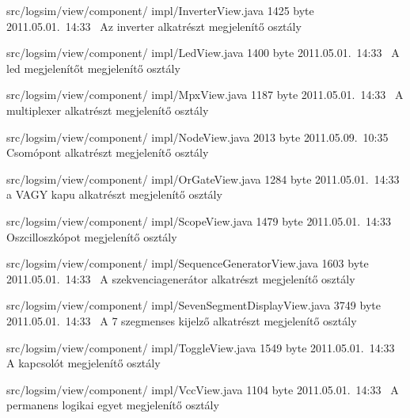 \begin{fajllista}
\fajl
{src/logsim/view/component/\newline
impl/InverterView.java} %
{1425 byte} %
{2011.05.01.~14:33~} %
{Az inverter alkatrészt megjelenítő osztály} %

\fajl
{src/logsim/view/component/\newline
impl/LedView.java} %
{1400 byte} %
{2011.05.01.~14:33~} %
{A led megjelenítőt megjelenítő osztály} %

\fajl
{src/logsim/view/component/\newline
impl/MpxView.java} %
{1187 byte} %
{2011.05.01.~14:33~} %
{A multiplexer alkatrészt megjelenítő osztály} %

\fajl
{src/logsim/view/component/\newline
impl/NodeView.java} %
{2013 byte} %
{2011.05.09.~10:35~} %
{Csomópont alkatrészt megjelenítő osztály} %

\fajl
{src/logsim/view/component/\newline
impl/OrGateView.java} %
{1284 byte} %
{2011.05.01.~14:33~} %
{a VAGY kapu alkatrészt megjelenítő osztály} %

\fajl
{src/logsim/view/component/\newline
impl/ScopeView.java} %
{1479 byte} %
{2011.05.01.~14:33~} %
{Oszcilloszkópot megjelenítő osztály} %

\fajl
{src/logsim/view/component/\newline
impl/SequenceGeneratorView.java} %
{1603 byte} %
{2011.05.01.~14:33~} %
{A szekvenciagenerátor alkatrészt megjelenítő osztály} %

\fajl
{src/logsim/view/component/\newline
impl/SevenSegmentDisplayView.java} %
{3749 byte} %
{2011.05.01.~14:33~} %
{A 7 szegmenses kijelző alkatrészt megjelenítő osztály} %

\fajl
{src/logsim/view/component/\newline
impl/ToggleView.java} %
{1549 byte} %
{2011.05.01.~14:33~} %
{A kapcsolót megjelenítő osztály} %

\fajl
{src/logsim/view/component/\newline
impl/VccView.java} %
{1104 byte} %
{2011.05.01.~14:33~} %
{A permanens logikai egyet megjelenítő osztály} %


\end{fajllista}
